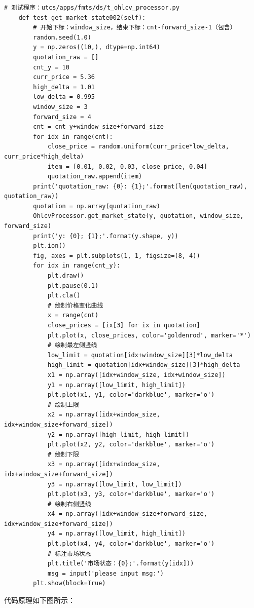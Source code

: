\begin{lstlisting}
# 测试程序：utcs/apps/fmts/ds/t_ohlcv_processor.py
    def test_get_market_state002(self):
        # 开始下标：window_size，结束下标：cnt-forward_size-1（包含）
        random.seed(1.0)
        y = np.zeros((10,), dtype=np.int64)
        quotation_raw = []
        cnt_y = 10
        curr_price = 5.36
        high_delta = 1.01
        low_delta = 0.995
        window_size = 3
        forward_size = 4
        cnt = cnt_y+window_size+forward_size
        for idx in range(cnt):
            close_price = random.uniform(curr_price*low_delta, curr_price*high_delta)
            item = [0.01, 0.02, 0.03, close_price, 0.04]
            quotation_raw.append(item)
        print('quotation_raw: {0}: {1};'.format(len(quotation_raw), quotation_raw))
        quotation = np.array(quotation_raw)
        OhlcvProcessor.get_market_state(y, quotation, window_size, forward_size)
        print('y: {0}; {1};'.format(y.shape, y))
        plt.ion()
        fig, axes = plt.subplots(1, 1, figsize=(8, 4))
        for idx in range(cnt_y):
            plt.draw()
            plt.pause(0.1)
            plt.cla()
            # 绘制价格变化曲线
            x = range(cnt)
            close_prices = [ix[3] for ix in quotation]
            plt.plot(x, close_prices, color='goldenrod', marker='*')
            # 绘制最左侧竖线
            low_limit = quotation[idx+window_size][3]*low_delta
            high_limit = quotation[idx+window_size][3]*high_delta
            x1 = np.array([idx+window_size, idx+window_size])
            y1 = np.array([low_limit, high_limit])
            plt.plot(x1, y1, color='darkblue', marker='o')
            # 绘制上限
            x2 = np.array([idx+window_size, idx+window_size+forward_size])
            y2 = np.array([high_limit, high_limit])
            plt.plot(x2, y2, color='darkblue', marker='o')
            # 绘制下限
            x3 = np.array([idx+window_size, idx+window_size+forward_size])
            y3 = np.array([low_limit, low_limit])
            plt.plot(x3, y3, color='darkblue', marker='o')
            # 绘制右侧竖线
            x4 = np.array([idx+window_size+forward_size, idx+window_size+forward_size])
            y4 = np.array([low_limit, high_limit])
            plt.plot(x4, y4, color='darkblue', marker='o')
            # 标注市场状态
            plt.title('市场状态：{0};'.format(y[idx]))
            msg = input('please input msg:')
        plt.show(block=True)
\end{lstlisting}
代码原理如下图所示：
